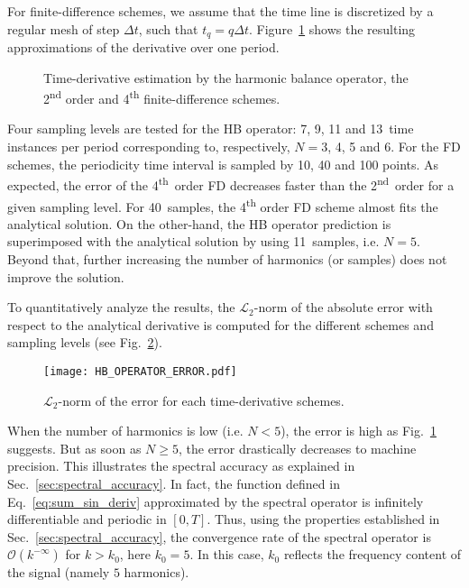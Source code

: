 For finite-difference schemes, 
we assume that the time line is discretized 
by a regular mesh of step $\Delta t$, such that $t_q = q \Delta t$.
Figure~\ref{fig:hb_operator_sample} shows the resulting approximations 
of the derivative over one period.
\begin{figure}[htb]
  \centering
  \caption{Time-derivative estimation by the harmonic balance operator,
  the 2\textsuperscript{nd} order and 4\textsuperscript{th} finite-difference schemes.}
  \label{fig:hb_operator_sample}
\end{figure}
Four sampling levels
are tested for the HB operator: 7, 9, 11 and 13~time instances per period
corresponding to, respectively, $N=3$, 4, 5 and 6.
For the FD schemes, the periodicity time interval is sampled by
10, 40 and 100 points.
As expected, the error of the 4\textsuperscript{th}~order FD
decreases faster  than the 2\textsuperscript{nd}~order for a given sampling level.
For 40~samples, the 4\textsuperscript{th} order FD
scheme almost fits the analytical solution. On the other-hand,
the HB operator prediction is superimposed with the analytical solution
by using 11~samples, i.e. $N=5$. Beyond that, further increasing the
number of harmonics (or samples)
does not improve the solution.

To quantitatively analyze the results, the 
$\mathcal{L}_2$-norm of the absolute error with respect to the analytical
derivative is computed for the different schemes and 
sampling levels (see Fig.~\ref{fig:hb_operator_error}).
\begin{figure}[htb]
  \centering
   \texttt{[image: HB\_OPERATOR\_ERROR.pdf]}
   \caption{$\mathcal{L}_2$-norm of the error for each time-derivative
   schemes.}
  \label{fig:hb_operator_error}
\end{figure}
When the number of harmonics is low 
(i.e. $N < 5$), the error is high as Fig.~\ref{fig:hb_operator_sample}
suggests. But as soon as $N \geq 5$, the error
drastically decreases to machine precision.
This illustrates the spectral accuracy as explained in 
Sec.~\ref{sec:spectral_accuracy}. In fact, the function defined
in Eq.~\eqref{eq:sum_sin_deriv} approximated by the spectral operator
is infinitely differentiable and periodic in $[0, T]$.
Thus, using the properties established in Sec.~\ref{sec:spectral_accuracy},
the convergence rate of the spectral operator is $\mathcal{O} (k^{-\infty})$
for $k > k_0$, here $k_0=5$. In this case, $k_0$
reflects the frequency content of the signal (namely $5$ harmonics).
